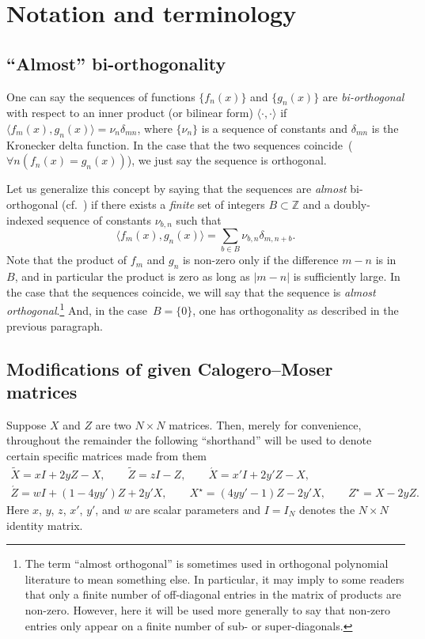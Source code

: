 \documentclass[pdftex]{sigma}
\numberwithin{equation}{section}
\theoremstyle{definition}
\begin{document}
\section{Notation and terminology}

\subsection{``Almost'' bi-orthogonality}\label{sec:almostdef}

One can say the
sequences of functions $\{f_n(x)\}$ and $\{g_n(x)\}$ are \textit{bi-orthogonal}
with respect to an inner product (or bilinear form) $\langle
\cdot,\cdot\rangle$ if~$
\langle f_m(x),g_n(x)\rangle = \nu_n \delta_{mn}
$,
where $\{\nu_n\}$ is a sequence of constants and $\delta_{mn}$ is the Kronecker delta function. In the case that the
two sequences coincide~($\forall n(f_n(x)=g_n(x))$), we just say the
sequence is orthogonal.

Let us generalize this concept by saying that the sequences are \textit{almost}
bi-orthogonal (cf.~\cite{BaileyDerev})
if there exists a \textit{finite} set of integers
$B\subset\mathbb{Z}$ and a doubly-indexed sequence of constants
$\nu_{b,n}$ such that
\[
\langle f_m(x),g_n(x)\rangle = \sum_{b\in B}\nu_{b,n} \delta_{m,n+b}.
\]
Note that the product of $f_m$ and $g_n$ is non-zero only if the
difference $m-n$ is in $B$, and in particular the product is zero as
long as $|m-n|$ is sufficiently large. In the case that the sequences
coincide, we will say that the sequence is \textit{almost
 orthogonal}.\footnote{The term ``almost orthogonal'' is sometimes used in
 orthogonal polynomial literature to mean something else. In
 particular, it may imply to some readers that only a finite number
 of off-diagonal entries in the matrix of products are non-zero.
 However, here it will be used more generally to say that non-zero
 entries only appear on a finite number of sub- or super-diagonals.} And, in the case~$B=\{0\}$, one has orthogonality as
described in the previous paragraph.





\subsection{Modifications of given Calogero--Moser matrices}\label{sec:tilde}

Suppose $X$ and $Z$ are two $N\times N$ matrices. Then, merely for
convenience, throughout the remainder the
following ``shorthand'' will be used to denote certain specific
matrices made from them
\begin{gather*}
\tilde X=xI+2yZ-X,\qquad
\tilde Z=zI-Z,
\qquad
\acute X=x'I+2y'Z-X,\\
\acute Z=w I+(1-4yy')Z+2y'X,
\qquad
X^\star=(4yy'-1)Z-2y'X,\qquad Z^\star=X-2yZ.
\end{gather*}
Here
$x$, $y$, $z$, $x'$, $y'$, and $w$ are scalar parameters
and $I=I_N$ denotes the $N\times N$ identity matrix.
\end{document}
